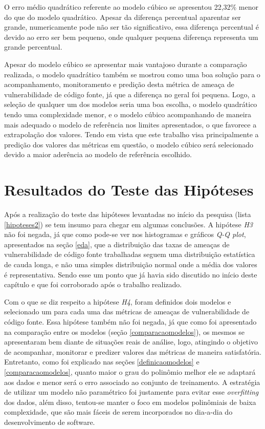 O erro médio quadrático referente ao modelo cúbico se apresentou 22,32\% menor
do que do modelo quadrático. Apesar da diferença percentual aparentar ser
grande, numericamente pode não ser tão significativo, essa diferença percentual
é devido ao erro ser bem pequeno, onde qualquer pequena diferença representa um
grande percentual.

Apesar do modelo cúbico se apresentar mais vantajoso durante a comparação
realizada, o modelo quadrático também se mostrou como uma boa solução para o
acompanhamento, monitoramento e predição desta métrica de ameaça de
vulnerabilidade de código fonte, já que a diferença no geral foi pequena. Logo,
a seleção de qualquer um dos modelos seria uma boa escolha, o modelo quadrático
tendo uma complexidade menor, e o modelo cúbico acompanhando de maneira
mais adequado o modelo de referência nos limites apresentados, o que favorece a
extrapolação dos valores. Tendo em vista que este trabalho visa principalmente
a predição dos valores das métricas em questão, o modelo cúbico será selecionado
devido a maior aderência ao modelo de referência escolhido.

\section{Resultados do Teste das Hipóteses}

Após a realização do teste das hipóteses levantadas no início da pesquisa (lista
\ref{hipoteses2}) se tem insumo para chegar em algumas conclusões. A hipótese
\textit{H3} não foi negada, já que como pode-se ver nos histogramas e gráficos
\textit{Q-Q plot}, apresentados na seção \ref{eda}, que a distribuição das taxas
de ameaças de vulnerabilidade de código fonte trabalhadas seguem uma
distribuição estatística de cauda longa, e não uma simples distribuição normal
onde a média dos valores é representativa.  Sendo esse um ponto que já havia
sido discutido no início deste capítulo e que foi corroborado após o trabalho
realizado.

Com o que se diz respeito a hipótese \textit{H4}, foram definidos dois modelos e
selecionado um para cada uma das métricas de ameaças de vulnerabilidade de
código fonte. Essa hipótese também não foi negada, já que como foi apresentado
na comparação entre os modelos (seção \ref{comparacaomodelos}), os mesmos se
apresentaram bem diante de situações reais de análise, logo, atingindo o
objetivo de acompanhar, monitorar e predizer valores das métricas de maneira
satisfatória. Entretanto, como foi explicado nas seções \ref{definicaomodelos} e
\ref{comparacaomodelos}, quanto maior o grau do polinômio melhor ele se adaptará
aos dados e menor será o erro associado ao conjunto de treinamento. A estratégia
de utilizar um modelo não paramétrico foi justamente para evitar esse
\textit{overfitting} dos dados, além disso, tentou-se manter o foco em modelos
polinômiais de baixa complexidade, que são mais fáceis de serem incorporados no
dia-a-dia do desenvolvimento de software.


